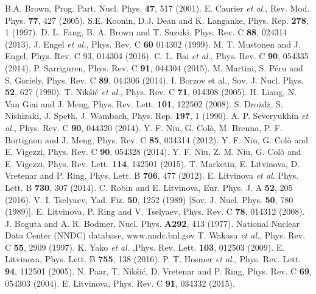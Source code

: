 \documentclass{PoS}
\begin{document}
\begin{thebibliography}{99}
 B.A. Brown, Prog. Part. Nucl. Phys. {\bf 47}, 517 (2001).
 E. Caurier  {\it et al.}, Rev. Mod. Phys. {\bf 77}, 427 (2005).
 S.E. Koonin, D.J. Dean and K. Langanke, Phys. Rep. {\bf 278}, 1 (1997).
 D. L. Fang, B. A. Brown and T. Suzuki, Phys. Rev. C {\bf 88}, 024314 (2013). %
 J. Engel  {\it et al.}, Phys. Rev. C {\bf 60} 014302 (1999). %
  M. T. Mustonen and J. Engel, Phys. Rev. C 93, 014304 (2016).
 C. L. Bai {\it et al.}, Phys. Rev. C {\bf 90}, 054335 (2014).
 P. Sarriguren, Phys. Rev. C {\bf  91}, 044304 (2015). %
 M. Martini, S. P\'eru and S. Goriely, Phys. Rev. C {\bf 89}, 044306 (2014). %
 I. Borzov et al., Sov. J. Nucl. Phys. {\bf 52}, 627 (1990). %
 T. Nik\v si\' c {\it et al.}, Phys. Rev. C {\bf 71}, 014308 (2005). %
 H. Liang, N. Van Giai and J. Meng, Phys. Rev. Lett. {\bf 101}, 122502 (2008). %
 S. Dro\.{z}d\.{z}, S. Nishizaki, J. Speth, J. Wambach, Phys. Rep. {\bf 197}, 1 (1990). %
 A. P.  Severyukhin {\it et al.}, Phys. Rev. C {\bf 90}, 044320 (2014).
 Y. F. Niu, G. Col\`o, M. Brenna, P. F. Bortignon and J. Meng, Phys. Rev. C {\bf 85}, 034314 (2012).
 Y. F. Niu, G. Col\`o and E. Vigezzi, Phys. Rev. C {\bf 90}, 054328 (2014).
 Y. F. Niu, Z. M. Niu, G. Col\`o and E. Vigezzi, Phys. Rev. Lett. {\bf 114}, 142501 (2015).
 T. Marketin, E. Litvinova, D. Vretenar and P. Ring, Phys. Lett. B {\bf 706}, 477 (2012).
 E. Litvinova {\it et al.} Phys. Lett. B {\bf 730}, 307 (2014).
   C. Robin and E. Litvinova, Eur. Phys. J. A {\bf 52}, 205 (2016).
   V. I. Tselyaev, Yad. Fiz. {\bf 50}, 1252 (1989) [Sov. J. Nucl. Phys. {\bf 50}, 780 (1989)].
   E. Litvinova, P. Ring and V. Tselyaev, Phys. Rev. C {\bf 78}, 014312 (2008).
     J. Boguta and A. R. Bodmer, Nucl. Phys. {\bf A292}, 413 (1977).
   National Nuclear Data Center (NNDC) database, www.nndc.bnl.gov
    T. Wakasa {\it et al.}, Phys. Rev. C {\bf 55}, 2909 (1997).
   K. Yako {\it et al.} ,Phys. Rev. Lett. {\bf 103}, 012503 (2009).
   E. Litvinova, Phys. Lett. B {\bf 755}, 138 (2016).
   P. T. Hosmer {\it et al.}, Phys. Rev. Lett. {\bf 94}, 112501 (2005).
   N. Paar, T. Nik\v si\' c, D. Vretenar and P. Ring, Phys. Rev. C {\bf 69}, 054303 (2004).
   E. Litvinova, Phys. Rev. C {\bf 91}, 034332 (2015).
\end{thebibliography}
\end{document}
